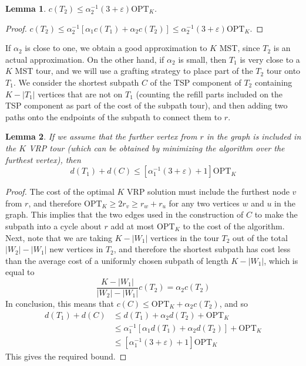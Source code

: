 \documentclass{article}
\theoremstyle{plain}
\newtheorem{lemma}{Lemma}
\theoremstyle{plain}
\begin{document}
\begin{lemma}
    $c(T_2) \leq \alpha_2^{-1}(3 + \varepsilon) \text{OPT}_K$.
\end{lemma}
\begin{proof}
    $c(T_2) \leq \alpha_2^{-1}[\alpha_1 c(T_1) + \alpha_2 c(T_2)] \leq \alpha_2^{-1} (3 + \varepsilon) \text{OPT}_K$.
\end{proof}

If $\alpha_2$ is close to one, we obtain a good approximation to $K$ MST, since $T_2$ is an actual approximation. On the other hand, if $\alpha_2$ is small, then $T_1$ is very close to a $K$ MST tour, and we will use a grafting strategy to place part of the $T_2$ tour onto $T_1$. We consider the shortest subpath $C$ of the TSP component of $T_2$ containing $K - |T_1|$ vertices that are not on $T_1$ (counting the refill parts included on the TSP component as part of the cost of the subpath tour), and then adding two paths onto the endpoints of the subpath to connect them to $r$.

\begin{lemma}
    If we assume that the further vertex from $r$ in the graph is included in the $K$ VRP tour (which can be obtained by minimizing the algorithm over the furthest vertex), then
    \[ d(T_1) + d(C) \leq [\alpha_1^{-1} (3 + \varepsilon) + 1] \text{OPT}_K \]
\end{lemma}
\begin{proof}
    The cost of the optimal $K$ VRP solution must include the furthest node $v$ from $r$, and therefore $\text{OPT}_K \geq 2r_v \geq r_w + r_u$ for any two vertices $w$ and $u$ in the graph. This implies that the two edges used in the construction of $C$ to make the subpath into a cycle about $r$ add at most $\text{OPT}_K$ to the cost of the algorithm. Next, note that we are taking $K - |W_1|$ vertices in the tour $T_2$ out of the total $|W_2| - |W_1|$ new vertices in $T_2$, and therefore the shortest subpath has cost less than the average cost of a uniformly chosen subpath of length $K - |W_1|$, which is equal to
    \[ \frac{K - |W_1|}{|W_2| - |W_1|} c(T_2) = \alpha_2 c(T_2) \]
    In conclusion, this means that $c(C) \leq \text{OPT}_K + \alpha_2 c(T_2)$, and so
    \begin{align*}
        d(T_1) + d(C) &\leq d(T_1) + \alpha_2 d(T_2) + \text{OPT}_K\\
        &\leq \alpha_1^{-1}[\alpha_1 d(T_1) + \alpha_2 d(T_2)] + \text{OPT}_K\\
        &\leq [\alpha_1^{-1} (3 + \varepsilon) + 1] \text{OPT}_K
    \end{align*}
    This gives the required bound.
\end{proof}
\end{document}
